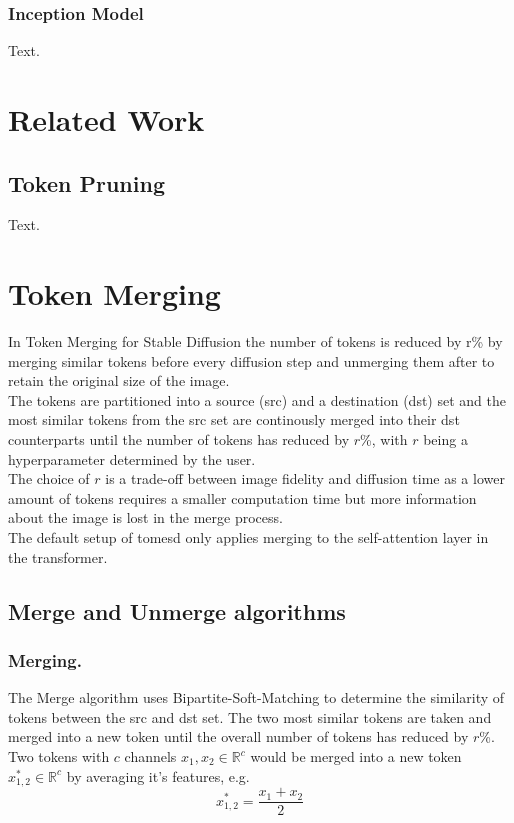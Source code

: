 \documentclass{article}
\begin{document}
\subsubsection{Inception Model}
Text.





\newpage
\section{Related Work}

\subsection{Token Pruning}
Text.





\newpage
\section{Token Merging}
In Token Merging for Stable Diffusion\cite{bolya2023tomesd} the number of tokens is reduced by r\% by merging similar tokens before every diffusion step and unmerging them after to retain the original size of the image.\\ The tokens are partitioned into a source (src) and a destination (dst) set and the most similar tokens from the src set are continously merged into their dst counterparts until the number of tokens has reduced by \(r\)\%, with \(r\) being a hyperparameter determined by the user.\\ The choice of \(r\) is a trade-off between image fidelity and diffusion time as a lower amount of tokens requires a smaller computation time but more information about the image is lost in the merge process.\\
The default setup of tomesd\cite{bolya2023tomesd} only applies merging to the self-attention layer in the transformer.

\subsection{Merge and Unmerge algorithms}
\subsubsection*{Merging.} The Merge algorithm uses Bipartite-Soft-Matching to determine the similarity of tokens between the src and dst set. The two most similar tokens are taken and merged into a new token until the overall number of tokens has reduced by \(r\)\%.\\
Two tokens with \(c\) channels \(x_1, x_2 \in \mathbb{R}^c\) would be merged into a new token \(x_{1,2}^* \in \mathbb{R}^c \) by averaging it's features, e.g. \[x_{1,2}^* = \frac{x_1 + x_2}{2}\]
\end{document}
